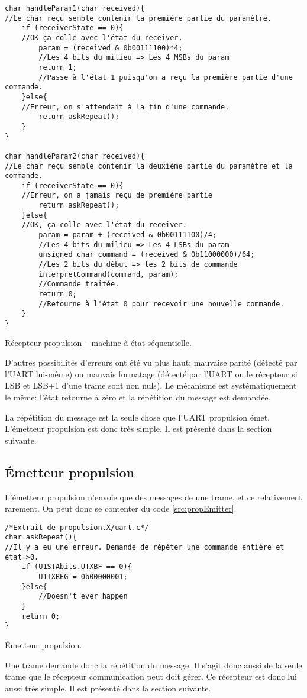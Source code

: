 \begin{listing}[htbp]
\begin{verbatim}
char handleParam1(char received){
//Le char reçu semble contenir la première partie du paramètre.
    if (receiverState == 0){
    //OK ça colle avec l'état du receiver.
        param = (received & 0b00111100)*4;
        //Les 4 bits du milieu => Les 4 MSBs du param
        return 1;
        //Passe à l'état 1 puisqu'on a reçu la première partie d'une commande.
    }else{
    //Erreur, on s'attendait à la fin d'une commande.
        return askRepeat();
    }
}

char handleParam2(char received){
//Le char reçu semble contenir la deuxième partie du paramètre et la commande.
    if (receiverState == 0){
    //Erreur, on a jamais reçu de première partie
        return askRepeat();
    }else{
    //OK, ça colle avec l'état du receiver.
        param = param + (received & 0b00111100)/4;
        //Les 4 bits du milieu => Les 4 LSBs du param
        unsigned char command = (received & 0b11000000)/64;
        //Les 2 bits du début => les 2 bits de commande
        interpretCommand(command, param);
        //Commande traitée.
        return 0;
        //Retourne à l'état 0 pour recevoir une nouvelle commande.
    }
}
\end{verbatim}
\caption{Récepteur propulsion -- machine à état séquentielle.\label{src:propReceptor}}
\end{listing}
D'autres possibilités d'erreurs ont été vu plus haut: mauvaise parité (détecté par l'UART lui-même) ou mauvais formatage (détecté par l'UART ou le récepteur si LSB et LSB+1 d'une trame sont non nuls). Le mécanisme est systématiquement le même: l'état retourne à zéro et la répétition du message est demandée.

La répétition du message est la seule chose que l'UART propulsion émet. L'émetteur propulsion est donc très simple. Il est présenté dans la section suivante.

\subsection{\'Emetteur propulsion}
L'émetteur propulsion n'envoie que des messages de une trame, et ce relativement rarement. On peut donc se contenter du code \ref{src:propEmitter}.
\begin{listing}[htbp]
\begin{verbatim}
/*Extrait de propulsion.X/uart.c*/
char askRepeat(){
//Il y a eu une erreur. Demande de répéter une commande entière et état=>0.
    if (U1STAbits.UTXBF == 0){
        U1TXREG = 0b00000001;
    }else{
        //Doesn't ever happen
    }
    return 0;
}
\end{verbatim}
\caption{\'Emetteur propulsion.\label{src:propEmitter}}
\end{listing}
Une trame  demande donc la répétition du message. Il s'agit donc aussi de la seule trame que le récepteur communication peut doit gérer. Ce récepteur est donc lui aussi très simple. Il est présenté dans la section suivante.

